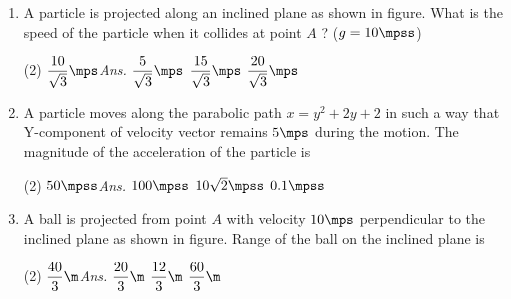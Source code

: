 \documentclass{article}
\newcommand{\ans}{\textcolor{red!95}{\textit{\quad Ans.}}}
\begin{document}
\begin{enumerate}
	\item A particle is projected along an inclined plane as shown in figure. What is the speed of the particle when it collides at point $A$ ? ($g = 10 \mpss$)
	\begin{center}
	\end{center}
	\begin{tasks}(2)
		\task $\dfrac{10}{\sqrt{3}}\mps$\ans
		\task $\dfrac{5}{\sqrt{3}}\mps$
		\task $\dfrac{15}{\sqrt{3}}\mps$
		\task $\dfrac{20}{\sqrt{3}}\mps$
	\end{tasks}
	
	\item A particle moves along the parabolic path $x = y^2 + 2y + 2$ in such a way that Y-component of
velocity vector remains $5 \mps$ during the motion. The magnitude of the acceleration of the particle is
	\begin{tasks}(2)
		\task $50\mpss$\ans
		\task $100\mpss$
		\task $10\sqrt{2}\mpss$
		\task $0.1\mpss$
	\end{tasks}
	
	\item A ball is projected from point $A$ with velocity $10 \mps$ perpendicular to the inclined plane as shown in figure. Range of the ball on the inclined plane is
	\begin{center}
	\end{center}
	\begin{tasks}(2)
		\task $\dfrac{40}{3}\m$\ans
		\task $\dfrac{20}{3}\m$
		\task $\dfrac{12}{3}\m$
		\task $\dfrac{60}{3}\m$
	\end{tasks}
	

\end{enumerate}
\end{document}

